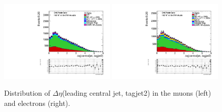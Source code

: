 \begin{figure}
\begin{center}
\includegraphics[width=0.49\textwidth]{figs/n-1_plots_mu/mu_EWK_W_2jets_centraljet_tagjet2_deltaeta_mjj_600_tagjet1_60_tagjet2_50_Zeppenfield_1point2_EWKW2jets.pdf}
\includegraphics[width=0.49\textwidth]{figs/n-1_plots_el/el_EWK_W_2jets_centraljet_tagjet2_deltaeta_mjj_600_tagjet1_60_tagjet2_50_Zeppenfield_1point2_met_30_WmT_30_EWKW2jets.pdf}
\end{center}
\caption{Distribution of $\Delta \eta$(leading central jet, tagjet2) in the muons (left) and electrons (right).}
\label{fig:centraljetdeltaetajettagjet2_20}
\end{figure}

